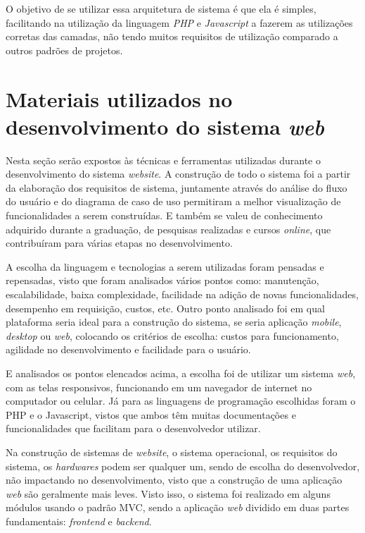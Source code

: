 \documentclass[
	12pt,				%
	openright,			%
	oneside,			%
	a4paper,			%
	english,			%
	french,				%
	spanish,			%
	brazil,				%
	]{abntex2}
\begin{document}
O objetivo de se utilizar essa arquitetura de sistema é que ela é simples, facilitando na utilização da linguagem \textit{PHP} e \textit{Javascript} a fazerem as utilizações corretas das camadas, não tendo muitos requisitos de utilização comparado a outros padrões de projetos.



\section{Materiais utilizados no desenvolvimento do sistema \textit{web}}

Nesta seção serão expostos às técnicas e ferramentas utilizadas durante o desenvolvimento do sistema \textit{website}. A construção de todo o sistema foi a partir da elaboração dos requisitos de sistema, juntamente através do análise do fluxo do usuário e do diagrama de caso de uso permitiram a melhor visualização de funcionalidades a serem construídas. E também se valeu de conhecimento adquirido durante a graduação, de pesquisas realizadas e cursos \textit{online}, que contribuíram para várias etapas no desenvolvimento.

A escolha da linguagem e tecnologias a serem utilizadas foram pensadas e repensadas, visto que foram analisados vários pontos como: manutenção, escalabilidade, baixa complexidade, facilidade na adição de novas funcionalidades, desempenho em requisição, custos, etc.
Outro ponto analisado foi em qual plataforma seria ideal para a construção do sistema, se seria aplicação \textit{mobile}, \textit{desktop} ou \textit{web}, colocando os critérios de escolha: custos para funcionamento, agilidade no desenvolvimento e facilidade para o usuário.

E analisados os pontos elencados acima, a escolha foi de utilizar um sistema \textit{web}, com as telas responsivos, funcionando em um navegador de internet no computador ou celular. Já para as linguagens de programação escolhidas foram o PHP e o Javascript, vistos que ambos têm muitas documentações e funcionalidades que facilitam para o desenvolvedor utilizar.

Na construção de sistemas de \textit{website}, o sistema operacional, os requisitos do sistema, os \textit{hardwares} podem ser qualquer um, sendo de escolha do desenvolvedor, não impactando no desenvolvimento, visto que a construção de uma aplicação \textit{web} são geralmente mais leves. Visto isso, o sistema foi realizado em alguns módulos usando o padrão MVC, sendo a aplicação \textit{web} dividido em duas partes fundamentais: \textit{frontend} e \textit{backend}.  
 
\end{document}
